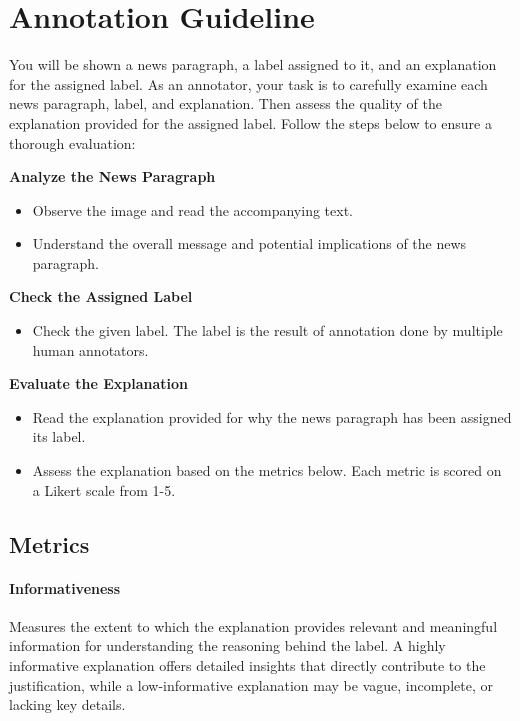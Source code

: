 
\section{Annotation Guideline}
\label{sec:app_annotation_guideline}
You will be shown a news paragraph, a label assigned to it, and an explanation for the assigned label. As an annotator, your task is to carefully examine each news paragraph, label, and explanation. Then assess the quality of the explanation provided for the assigned label. Follow the steps below to ensure a thorough evaluation:

\textbf{Analyze the News Paragraph}

\begin{itemize}[noitemsep,topsep=0pt,labelsep=.5em]
    \item Observe the image and read the accompanying text.
    \item Understand the overall message and potential implications of the news paragraph.
\end{itemize}

\textbf{Check the Assigned Label}
\begin{itemize}[noitemsep,topsep=0pt,labelsep=.5em]
    \item Check the given label. The label is the result of annotation done by multiple human annotators.
\end{itemize}

\textbf{Evaluate the Explanation}
\begin{itemize}[noitemsep,topsep=0pt,labelsep=.5em]
    \item Read the explanation provided for why the news paragraph has been assigned its label.
    \item Assess the explanation based on the metrics below. Each metric is scored on a Likert scale from 1-5.
\end{itemize}

\subsection*{Metrics}

\paragraph{Informativeness}
Measures the extent to which the explanation provides relevant and meaningful information for understanding the reasoning behind the label. A highly informative explanation offers detailed insights that directly contribute to the justification, while a low-informative explanation may be vague, incomplete, or lacking key details.

